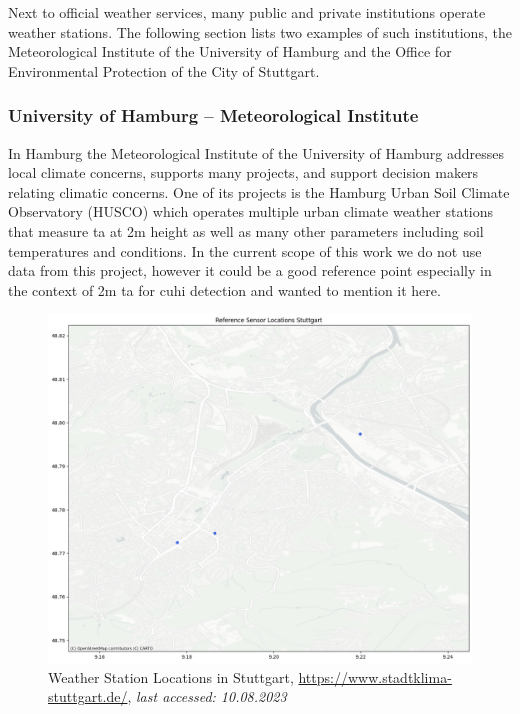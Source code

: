 Next to official weather services, many public and private institutions operate weather stations. The following section lists two examples of such institutions, the Meteorological Institute of the University of Hamburg and the Office for Environmental Protection of the City of Stuttgart.

\subsubsection{University of Hamburg – Meteorological Institute}

In Hamburg the Meteorological Institute of the University of Hamburg addresses local climate concerns, supports many projects, and support decision makers relating climatic concerns. One of its projects is the Hamburg Urban Soil Climate Observatory (HUSCO) which operates multiple urban climate weather stations that measure \gls{ta} at 2m height as well as many other parameters including soil temperatures and conditions. In the current scope of this work we do not use data from this project, however it could be a good reference point especially in the context of 2m \gls{ta} for \gls{cuhi} detection and wanted to mention it here.

\begin{figure}[ht]
    \centering
    \includegraphics[width=1\textwidth]{images/afu_stuttgart_sensor_locations.png}
    \caption{Weather Station Locations in Stuttgart, \url{https://www.stadtklima-stuttgart.de/}, \textit{last accessed: 10.08.2023}}
    \label{fig:afu weather station locations}
\end{figure}


